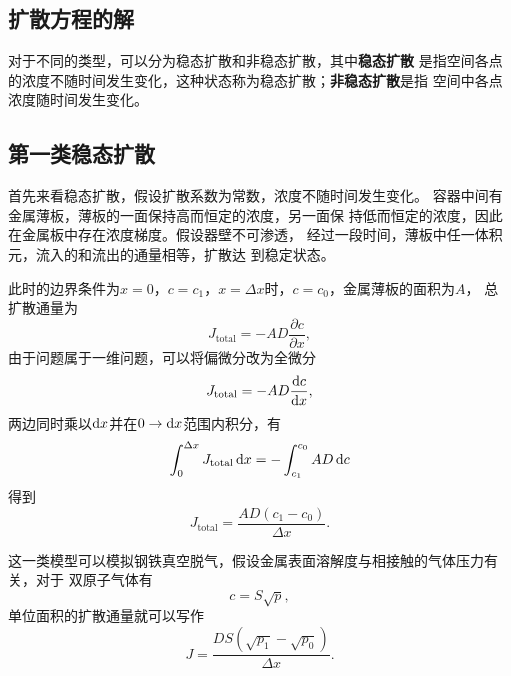         \subsection{扩散方程的解}
            对于不同的类型，可以分为稳态扩散和非稳态扩散，其中\textbf{稳态扩散}
            是指空间各点的浓度不随时间发生变化，这种状态称为稳态扩散；\textbf{非稳态扩散}是指
            空间中各点浓度随时间发生变化。
            \subsection{第一类稳态扩散}
                首先来看稳态扩散，假设扩散系数为常数，浓度不随时间发生变化。
                容器中间有金属薄板，薄板的一面保持高而恒定的浓度，另一面保
                持低而恒定的浓度，因此在金属板中存在浓度梯度。假设器壁不可渗透，
                经过一段时间，薄板中任一体积元，流入的和流出的通量相等，扩散达
                到稳定状态。
                
                此时的边界条件为$x=0$，$c=c_1$，$x=\Delta x$时，$c=c_0$，金属薄板的面积为$A$，
                总扩散通量为
                \begin{equation}
                    J_{\text{total}}=-AD\frac{\partial c}{\partial x},
                \end{equation}
                由于问题属于一维问题，可以将偏微分改为全微分
                \begin{equation}
                    J_{\text{total}}=-AD\frac{\mathop{}\!\mathrm{d} c}{\mathop{}\!\mathrm{d} x},
                \end{equation}
                两边同时乘以$\mathop{}\!\mathrm{d} x$并在$0\to\mathop{}\!\mathrm{d} x$范围内积分，有
                \begin{equation}
                    \int_{0}^{\Delta x}J_{\text{total}}\mathop{}\!\mathrm{d} x=-\int_{c_{1}}^{c_{0}} A D \mathop{}\!\mathrm{d} c
                \end{equation}
                得到
                \begin{equation}
                    J_{\text{total}}=\frac{AD(c_1-c_0)}{\Delta x}.
                \end{equation}

                这一类模型可以模拟钢铁真空脱气，假设金属表面溶解度与相接触的气体压力有关，对于
                双原子气体有
                \begin{equation}
                    c=S\sqrt{p},
                \end{equation}
                单位面积的扩散通量就可以写作
                \begin{equation}
                    J=\frac{D S\left(\sqrt{p_{1}}-\sqrt{p_{0}}\right)}{\Delta x}.
                \end{equation}
